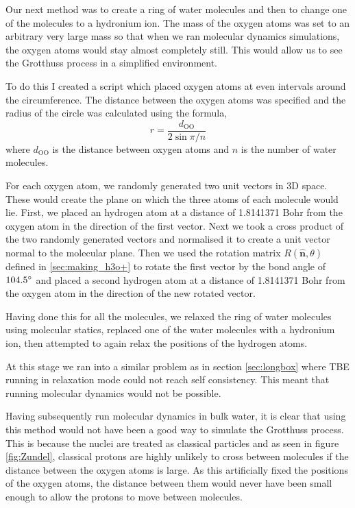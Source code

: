 \documentclass{article}
\begin{document}
\begin{multicols}{2}
Our next method was to create a ring of water molecules and then to change one of the molecules to a hydronium ion. The mass of the oxygen atoms was set to an arbitrary very large mass so that when we ran molecular dynamics simulations, the oxygen atoms would stay almost completely still. This would allow us to see the Grotthuss process in a simplified environment.

To do this I created a script which placed oxygen atoms at even intervals around the circumference. The distance between the oxygen atoms was specified and the radius of the circle was calculated using the formula,
\begin{equation}
	r=\frac{d_{\text{OO}}}{2\sin{\pi/n}}
\end{equation} 
where $d_\text{OO}$ is the distance between oxygen atoms and $n$ is the number of water molecules.

For each oxygen atom, we randomly generated two unit vectors in 3D space. These would create the plane on which the three atoms of each molecule would lie. First, we placed an hydrogen atom at a distance of 1.8141371 Bohr from the oxygen atom in the direction of the first vector. Next we took a cross product of the two randomly generated vectors and normalised it to create a unit vector normal to the molecular plane. Then we used the rotation matrix $R(\boldsymbol{\hat{\textbf{n}}},\theta)$ defined in \ref{sec:making_h3o+} to rotate the first vector by the bond angle of $104.5\degree$ and placed a second hydrogen atom at a distance of 1.8141371 Bohr from the oxygen atom in the direction of the new rotated vector.

Having done this for all the molecules, we relaxed the ring of water molecules using molecular statics, replaced one of the water molecules with a hydronium ion, then attempted to again relax the positions of the hydrogen atoms. 

At this stage we ran into a similar problem as in section \ref{sec:longbox} where TBE running in relaxation mode could not reach self consistency. This meant that running molecular dynamics would not be possible.

Having subsequently run molecular dynamics in bulk water, it is clear that using this method would not have been a good way to simulate the Grotthuss process. This is because the nuclei are treated as classical particles and as seen in figure \ref{fig:Zundel}, classical protons are highly unlikely to cross between molecules if the distance between the oxygen atoms is large. As this artificially fixed the positions of the oxygen atoms, the distance between them would never have been small enough to allow the protons to move between molecules.


\end{multicols}
\end{document}
